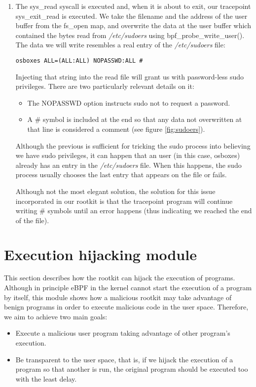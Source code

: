 \begin{enumerate}
\item The sys\_read syscall is executed and, when it is about to exit, our tracepoint sys\_exit\_read is executed. We take the filename and the address of the user buffer from the fs\_open map, and overwrite the data at the user buffer which contained the bytes read from \textit{/etc/sudoers} using bpf\_probe\_write\_user(). The data we will write resembles a real entry of the \textit{/etc/sudoers} file:
\begin{verbatim}
osboxes ALL=(ALL:ALL) NOPASSWD:ALL #
\end{verbatim}

Injecting that string into the read file will grant us with password-less sudo privileges. There are two particularly relevant details on it:
\begin{itemize}
\item The NOPASSWD option instructs sudo not to request a password.
\item A \# symbol is included at the end so that any data not overwritten at that line is considered a comment (see figure \ref{fig:sudoers}).
\end{itemize}

Although the previous is sufficient for tricking the sudo process into believing we have sudo privileges, it can happen that an user (in this case, osboxes) already has an entry in the \textit{/etc/sudoers} file. When this happens, the sudo process usually chooses the last entry that appears on the file or fails. 

Although not the most elegant solution, the solution for this issue incorporated in our rootkit is that the tracepoint program will continue writing \# symbols until an error happens (thus indicating we reached the end of the file).

\end{enumerate}


\section{Execution hijacking module}
This section describes how the rootkit can hijack the execution of programs. Although in principle eBPF in the kernel cannot start the execution of a program by itself, this module shows how a malicious rootkit may take advantage of benign programs in order to execute malicious code in the user space. Therefore, we aim to achieve two main goals:
\begin{itemize}
\item Execute a malicious user program taking advantage of other program's execution.
\item Be transparent to the user space, that is, if we hijack the execution of a program so that another is run, the original program should be executed too with the least delay.
\end{itemize}

